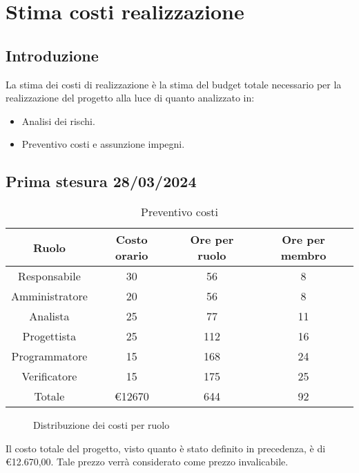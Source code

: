 \section{Stima costi realizzazione}
\subsection{Introduzione}
La stima dei costi di realizzazione è la stima del budget totale necessario per la realizzazione del progetto alla luce di quanto analizzato in:
\begin{itemize}
    \item Analisi dei rischi.
    \item Preventivo costi e assunzione impegni.
\end{itemize}

\subsection{Prima stesura 28/03/2024}

\begin{table}[!h]
	\centering
		\begin{tabular}{ |c|c|c|c| }
			\hline
			\textbf{Ruolo}   & \textbf{Costo orario} & \textbf{Ore per ruolo} & \textbf{Ore per membro} \\
			\hline
			Responsabile   & 30           & 56            & 8              \\
			Amministratore & 20           & 56            & 8              \\
			Analista       & 25           & 77            & 11             \\
			Progettista    & 25           & 112           & 16             \\
			Programmatore  & 15           & 168           & 24             \\
			Verificatore   & 15           & 175           & 25             \\
			\hline
			Totale         & €12670       & 644           & 92             \\
			\hline
		\end{tabular}
        \caption{Preventivo costi}
    \label{tab:2}
\end{table}

\begin{figure*}
    \centering
    \caption{Distribuzione dei costi per ruolo}
    \label{fig:1}
    \end{figure*}

Il costo totale del progetto, visto quanto è stato definito in precedenza, è di €12.670,00. Tale prezzo verrà considerato come prezzo invalicabile. 
\newpage
